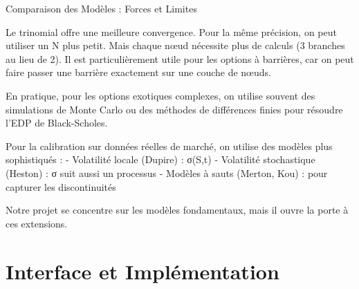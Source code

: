 \documentclass[aspectratio=169, 10pt]{beamer}
\begin{document}
\begin{frame}{Comparaison des Modèles : Forces et Limites}
{        Le trinomial offre une meilleure convergence.
        Pour la même précision, on peut utiliser un N plus petit.
        Mais chaque nœud nécessite plus de calculs (3 branches au lieu de 2).
        Il est particulièrement utile pour les options à barrières,
        car on peut faire passer une barrière exactement sur une couche de nœuds.
        
        En pratique, pour les options exotiques complexes,
        on utilise souvent des simulations de Monte Carlo
        ou des méthodes de différences finies pour résoudre l'EDP de Black-Scholes.
        
        Pour la calibration sur données réelles de marché,
        on utilise des modèles plus sophistiqués :
        - Volatilité locale (Dupire) : σ(S,t)
        - Volatilité stochastique (Heston) : σ suit aussi un processus
        - Modèles à sauts (Merton, Kou) : pour capturer les discontinuités
        
        Notre projet se concentre sur les modèles fondamentaux,
        mais il ouvre la porte à ces extensions.
    }
\end{frame}

\section{Interface et Implémentation}
\end{document}
